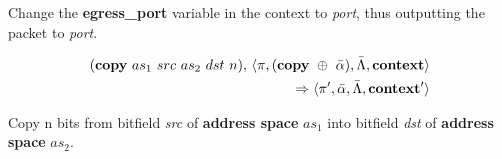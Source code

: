 Change the \textbf{egress\_port} variable in the context to \textit{port}, thus outputting the packet to \textit{port}.

\begin{equation}
\begin{split}
  (\textrm{\textbf{copy}} \ as_1 \ src \ as_2 \ dst \ n)
  \textrm{,} \ \langle \pi, (\textbf{\textrm{copy}} \ \oplus \ \bar \alpha), \bar \Lambda, \textrm{\textbf{context}} \rangle \\ \Rightarrow
  \langle \pi', \bar \alpha, \bar \Lambda, \textrm{\textbf{context}}' \rangle
\end{split}
\end{equation}

Copy n bits from bitfield \textit{src} of \textbf{address space} $as_1$ into bitfield \textit{dst} of \textbf{address space} $as_2$.

